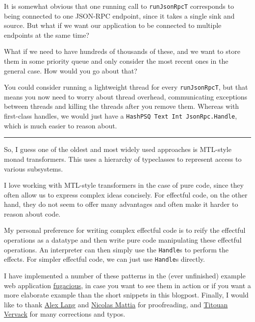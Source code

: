 It is somewhat obvious that one running call to \texttt{runJsonRpcT}
corresponds to being connected to one JSON-RPC endpoint, since it takes
a single sink and source. But what if we want our application to be
connected to multiple endpoints at the same time?

What if we need to have hundreds of thousands of these, and we want to
store them in some priority queue and only consider the most recent ones
in the general case. How would you go about that?

You could consider running a lightweight thread for every
\texttt{runJsonRpcT}, but that means you now need to worry about thread
overhead, communicating exceptions between threads and killing the
threads after you remove them. Whereas with first-class handles, we
would just have a \texttt{HashPSQ\ Text\ Int\ JsonRpc.Handle}, which is
much easier to reason about.

\begin{center}\rule{0.5\linewidth}{\linethickness}\end{center}

\noindent So, I guess one of the oldest and most widely used approaches is
MTL-style monad transformers. This uses a hierarchy of typeclasses to
represent access to various subsystems.

I love working with MTL-style transformers in the case of pure code,
since they often allow us to express complex ideas concisely. For
effectful code, on the other hand, they do not seem to offer many
advantages and often make it harder to reason about code.

My personal preference for writing complex effectful code is to reify
the effectful operations as a datatype and then write pure code
manipulating these effectful operations. An interpreter can then simply
use the \texttt{Handle}s to perform the effects. For simpler effectful
code, we can just use \texttt{Handle}s directly.

I have implemented a number of these patterns in the (ever unfinished)
example web application
\href{https://github.com/jaspervdj/fugacious}{fugacious}, in case you
want to see them in action or if you want a more elaborate example than
the short snippets in this blogpost. Finally, I would like to thank
\href{https://github.com/alang9/}{Alex Lang} and
\href{http://www.nmattia.com/}{Nicolas Mattia} for proofreading, and
\href{https://github.com/tivervac}{Titouan Vervack} for many corrections
and typos.
